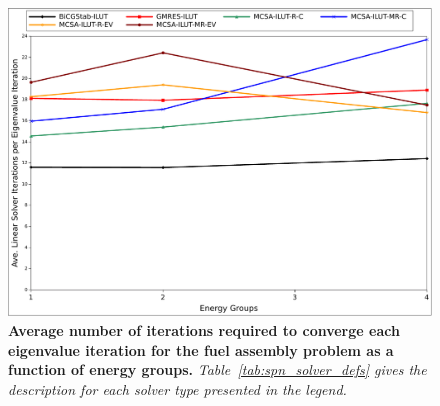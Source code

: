 \begin{figure}[t!]
  \begin{center}
    \includegraphics[width=6in]{chapters/spn_equations/solver_iters.pdf}
  \end{center}
  \caption{\textbf{Average number of iterations required to converge
      each eigenvalue iteration for the fuel assembly problem as a
      function of energy groups.}
    \textit{Table~\ref{tab:spn_solver_defs} gives the description for
      each solver type presented in the legend.}}
  \label{fig:spn_comparison_iterations}
\end{figure}

